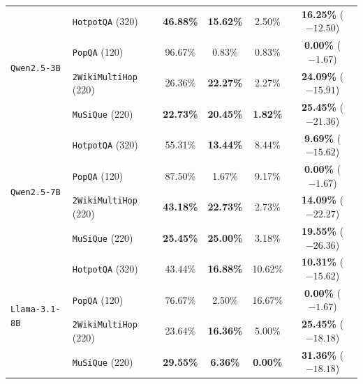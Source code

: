 \documentclass[11pt]{article}
\begin{document}
\begin{table}[t]
{\begin{tabular}{llcccc}
\midrule
\multirow{4}{*}{\texttt{Qwen2.5-3B}}
& \texttt{HotpotQA} (320) & \textbf{46.88\%} & \textbf{15.62\%} & 2.50\% & \textbf{16.25\%} ($-12.50$) \\
& \texttt{PopQA} (120) & 96.67\% & 0.83\% & 0.83\% & \textbf{0.00\%} ($-1.67$) \\
& \texttt{2WikiMultiHop} (220) & 26.36\% & \textbf{22.27\%} & 2.27\% & \textbf{24.09\%} ($-15.91$) \\
& \texttt{MuSiQue} (220) & \textbf{22.73\%} & \textbf{20.45\%} & \textbf{1.82\%} & \textbf{25.45\%} ($-21.36$) \\
\midrule
\multirow{4}{*}{\texttt{Qwen2.5-7B}}
& \texttt{HotpotQA} (320) & 55.31\% & \textbf{13.44\%} & 8.44\% & \textbf{9.69\%} ($-15.62$) \\
& \texttt{PopQA} (120) & 87.50\% & 1.67\% & 9.17\% & \textbf{0.00\%} ($-1.67$) \\
& \texttt{2WikiMultiHop} (220) & \textbf{43.18\%} & \textbf{22.73\%} & 2.73\% & \textbf{14.09\%} ($-22.27$) \\
& \texttt{MuSiQue} (220) & \textbf{25.45\%} & \textbf{25.00\%} & 3.18\% & \textbf{19.55\%} ($-26.36$) \\
\midrule
\multirow{4}{*}{\texttt{Llama-3.1-8B}}
& \texttt{HotpotQA} (320) & 43.44\% & \textbf{16.88\%} & 10.62\% & \textbf{10.31\%} ($-15.62$) \\
& \texttt{PopQA} (120) & 76.67\% & 2.50\% & 16.67\% & \textbf{0.00\%} ($-1.67$) \\
& \texttt{2WikiMultiHop} (220) & 23.64\% & \textbf{16.36\%} & 5.00\% & \textbf{25.45\%} ($-18.18$) \\
& \texttt{MuSiQue} (220) & \textbf{29.55\%} & \textbf{6.36\%} & \textbf{0.00\%} & \textbf{31.36\%} ($-18.18$) \\
\bottomrule
\end{tabular}
}
\end{table}
\end{document}
